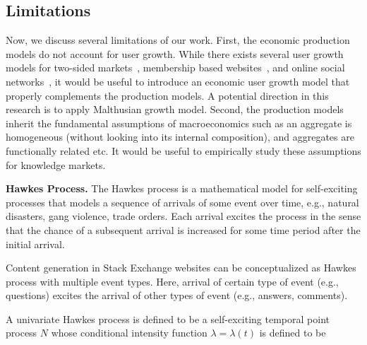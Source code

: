 \subsection{Limitations}
Now, we discuss several limitations of our work. First, the economic production models do not account for user growth. While there exists several user growth models for two-sided markets~\cite{Kumar2010}, membership based websites~\cite{Ribeiro2014}, and online social networks~\cite{zang2016}, it would be useful to introduce an economic user growth model that properly complements the production models. A potential direction in this research is to apply Malthusian growth model. Second, the production models inherit the fundamental assumptions of macroeconomics such as an aggregate is homogeneous (without looking into its internal composition), and aggregates are functionally related etc. It would be useful to empirically study these assumptions for knowledge markets.



\iffalse
\textbf{Hawkes Process.} The Hawkes process is a mathematical model for self-exciting processes that models a sequence of arrivals of some event over time, e.g., natural disasters, gang violence, trade orders.  Each arrival excites the process in the sense that the chance of a subsequent arrival is increased for some time period after the initial arrival. 

Content generation in Stack Exchange websites can be conceptualized as Hawkes process with multiple event types. Here, arrival of certain type of event (e.g., questions) excites the arrival of other types of event (e.g., answers, comments). 

A univariate Hawkes process is defined to be a self-exciting temporal point process $N$ whose conditional intensity function $\lambda = \lambda(t)$ is defined to be

